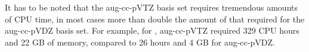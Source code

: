 It has to be noted that the aug-cc-pVTZ basis set requires tremendous amounts of CPU time, in most cases more than double the amount of that required for the aug-cc-pVDZ basis set.
For example, for , aug-cc-pVTZ required 329 CPU hours and 22 GB of memory, compared to 26  hours and 4 GB for aug-cc-pVDZ.




%	
